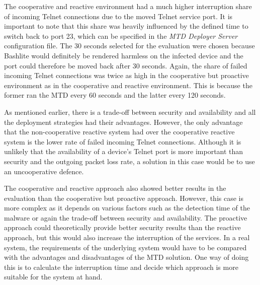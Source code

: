 The cooperative and reactive environment had a much higher interruption share of incoming Telnet connections due to the moved Telnet service port. It is important to note that this share was heavily influenced by the defined time to switch back to port 23, which can be specified in the \textit{MTD Deployer Server} configuration file. The 30 seconds selected for the evaluation were chosen because Bashlite would definitely be rendered harmless on the infected device and the port could therefore be moved back after 30 seconds. Again, the share of failed incoming Telnet connections was twice as high in the cooperative but proactive environment as in the cooperative and reactive environment. This is because the former ran the MTD every 60 seconds and the latter every 120 seconds. 



As mentioned earlier, there is a trade-off between security and availability and all the deployment strategies had their advantages. However, the only advantage that the non-cooperative reactive system had over the cooperative reactive system is the lower rate of failed incoming Telnet connections. Although it is unlikely that the availability of a device's Telnet port is more important than security and the outgoing packet loss rate, a solution in this case would be to use an uncooperative defence.

The cooperative and reactive approach also showed better results in the evaluation than the cooperative but proactive approach. However, this case is more complex as it depends on various factors such as the detection time of the malware or again the trade-off between security and availability. The proactive approach could theoretically provide better security results than the reactive approach, but this would also increase the interruption of the services. In a real system, the requirements of the underlying system would have to be compared with the advantages and disadvantages of the MTD solution. One way of doing this is to calculate the interruption time and decide which approach is more suitable for the system at hand. 



